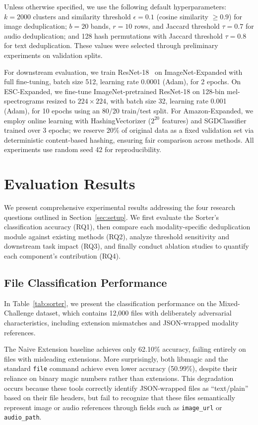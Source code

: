 \documentclass[sigconf, nonacm]{acmart}
\begin{document}
Unless otherwise specified, we use the following default hyperparameters: $k = 2000$ clusters and similarity threshold $\epsilon = 0.1$ (cosine similarity $\geq 0.9$) for image deduplication; $b = 20$ bands, $r = 10$ rows, and Jaccard threshold $\tau = 0.7$ for audio deduplication; and 128 hash permutations with Jaccard threshold $\tau = 0.8$ for text deduplication. These values were selected through preliminary experiments on validation splits.

For downstream evaluation, we train ResNet-18~\cite{he2016deep} on ImageNet-Expanded with full fine-tuning, batch size 512, learning rate 0.0001 (Adam), for 2 epochs. On ESC-Expanded, we fine-tune ImageNet-pretrained ResNet-18 on 128-bin mel-spectrograms resized to $224 \times 224$, with batch size 32, learning rate 0.001 (Adam), for 10 epochs using an 80/20 train/test split. For Amazon-Expanded, we employ online learning with HashingVectorizer ($2^{20}$ features) and SGDClassifier trained over 3 epochs; we reserve 20\% of original data as a fixed validation set via deterministic content-based hashing, ensuring fair comparison across methods. All experiments use random seed 42 for reproducibility.


\section{Evaluation Results}
\label{sec:results}
We present comprehensive experimental results addressing the four research questions outlined in Section~\ref{sec:setup}. We first evaluate the Sorter's classification accuracy (RQ1), then compare each modality-specific deduplication module against existing methods (RQ2), analyze threshold sensitivity and downstream task impact (RQ3), and finally conduct ablation studies to quantify each component's contribution (RQ4).

\subsection{File Classification Performance}

In Table~\ref{tab:sorter}, we present the classification performance on the Mixed-Challenge dataset, which contains 12,000 files with deliberately adversarial characteristics, including extension mismatches and JSON-wrapped modality references.

The Naive Extension baseline achieves only 62.10\% accuracy, failing entirely on files with misleading extensions. More surprisingly, both libmagic and the standard \texttt{file} command achieve even lower accuracy (50.99\%), despite their reliance on binary magic numbers rather than extensions. This degradation occurs because these tools correctly identify JSON-wrapped files as ``text/plain'' based on their file headers, but fail to recognize that these files semantically represent image or audio references through fields such as \texttt{image\_url} or \texttt{audio\_path}.
\end{document}
